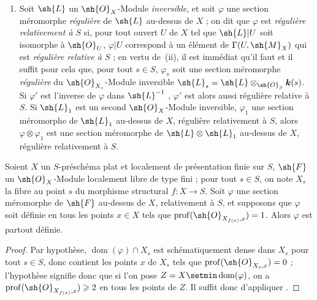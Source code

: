 \begin{remarks}[20.6.5]
\begin{enumerate}[label=(\roman*)]
  \item Soit $\sh{L}$ un $\sh{O}_X$-Module \emph{inversible}, et soit $\varphi$ une section méromorphe \emph{régulière} de $\sh{L}$ au-dessus de $X$  ; on dit que $\varphi$ est \emph{régulière relativement à $S$} si, pour tout ouvert $U$ de $X$ tel que $\sh{L}|U$ soit isomorphe à $\sh{O}_U$, $\varphi|U$ correspond à un élément de $\Gamma(U,\sh{M}_X)$ qui est \emph{régulière relative à $S$} ; en vertu de~(ii), il est immédiat qu'il faut et il suffit pour cela que, pour tout $s\in S$, $\varphi_s$ soit une section méromorphe \emph{régulière}  du $\sh{O}_{X_s}$-Module inversible $\sh{L}_s=\sh{L}\otimes_{\sh{O}_S}\boldsymbol{k}(s)$.
  Si $\varphi'$ est l'inverse de $\varphi$ dans $\sh{L}^{-1}$ , $\varphi'$ est alors aussi régulière relative à $S$.
  Si $\sh{L}_1$ est un second $\sh{O}_X$-Module inversible, $\varphi_1$ une section méromorphe de $\sh{L}_1$ au-dessus de $X$, régulière relativement à $S$, alors $\varphi\otimes\varphi_1$ est une section méromorphe de $\sh{L}\otimes\sh{L}_1$ au-dessus de $X$, régulière relativement à $S$.
\end{enumerate}
\end{remarks}

\begin{proposition}[20.6.6]
\label{IV.20.6.6}
Soient $X$ un $S$-préschéma plat et localement de présentation finie sur $S$, $\sh{F}$ un $\sh{O}_X$-Module localement libre de type fini ; pour tout $s\in S$, on note $X_s$ la fibre au point $s$ du morphisme structural $f:X\to S$.
Soit $\varphi$ une section méromorphe de $\sh{F}$ au-dessus de $X$, relativement à $S$, et supposons que $\varphi$ soit définie en tous les points $x\in X$ tels que $\operatorname{prof}(\sh{O}_{X_{f(x)},x})=1$.
Alors $\varphi$ est partout définie.
\end{proposition}

\begin{proof}
Par hypothèse, $\operatorname{dom}(\varphi)\cap X_s$ est schématiquement dense dans $X_s$ pour tout $s\in S$, donc contient les points $x$ de $X_s$ tels que $\operatorname{prof}(\sh{O}_{X_s,x})=0$  ; l'hypothèse signifie donc que si l'on pose $Z=X\setmin\operatorname{dom}(\varphi)$, on a $\operatorname{prof}(\sh{O}_{X_{f(x)},x})\geq2$ en tous les points de $Z$.
Il suffit donc d'appliquer .
\end{proof}

